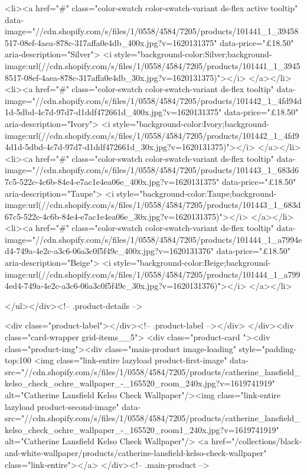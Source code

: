 {{{{{{{<li><a href="#" class="color-swatch color-swatch-variant ds-flex active tooltip" data-image="//cdn.shopify.com/s/files/1/0558/4584/7205/products/101441_1_39458517-08ef-4aea-878c-317affa0e4db_400x.jpg?v=1620131375" data-price="£18.50" aria-description="Silver">
              <i style="background-color:Silver;background-image:url(//cdn.shopify.com/s/files/1/0558/4584/7205/products/101441_1_39458517-08ef-4aea-878c-317affa0e4db_30x.jpg?v=1620131375)"></i>
            </a></li>
<li><a href="#" class="color-swatch color-swatch-variant ds-flex tooltip" data-image="//cdn.shopify.com/s/files/1/0558/4584/7205/products/101442_1_4fd94d1d-5dbd-4c7d-97d7-d1ddf472661d_400x.jpg?v=1620131375" data-price="£18.50" aria-description="Ivory">
              <i style="background-color:Ivory;background-image:url(//cdn.shopify.com/s/files/1/0558/4584/7205/products/101442_1_4fd94d1d-5dbd-4c7d-97d7-d1ddf472661d_30x.jpg?v=1620131375)"></i>
            </a></li>
<li><a href="#" class="color-swatch color-swatch-variant ds-flex tooltip" data-image="//cdn.shopify.com/s/files/1/0558/4584/7205/products/101443_1_683d67c5-522c-4c6b-84e4-e7ac1e4ea06e_400x.jpg?v=1620131375" data-price="£18.50" aria-description="Taupe">
              <i style="background-color:Taupe;background-image:url(//cdn.shopify.com/s/files/1/0558/4584/7205/products/101443_1_683d67c5-522c-4c6b-84e4-e7ac1e4ea06e_30x.jpg?v=1620131375)"></i>
            </a></li>
<li><a href="#" class="color-swatch color-swatch-variant ds-flex tooltip" data-image="//cdn.shopify.com/s/files/1/0558/4584/7205/products/101444_1_a7994ed4-749a-4e2c-a3c6-06a3c0f5f49c_400x.jpg?v=1620131376" data-price="£18.50" aria-description="Beige">
              <i style="background-color:Beige;background-image:url(//cdn.shopify.com/s/files/1/0558/4584/7205/products/101444_1_a7994ed4-749a-4e2c-a3c6-06a3c0f5f49c_30x.jpg?v=1620131376)"></i>
            </a></li>

      </ul></div><!-- .product-details -->

<div class="product-label"></div><!-- .product-label --></div>
          </div><div class="card-wrapper grid-items__5">
            <div class="product-card "><div class="product-img"><div class="main-product image-loading" style="padding-top:100%
      <img class="link-entire lazyload product-first-image" data-src="//cdn.shopify.com/s/files/1/0558/4584/7205/products/catherine_lansfield_kelso_check_ochre_wallpaper_-_165520_room_240x.jpg?v=1619741919" alt="Catherine Lansfield Kelso Check Wallpaper"/><img class="link-entire lazyload product-second-image" data-src="//cdn.shopify.com/s/files/1/0558/4584/7205/products/catherine_lansfield_kelso_check_ochre_wallpaper_-_165520_room1_240x.jpg?v=1619741919" alt="Catherine Lansfield Kelso Check Wallpaper"/>
      <a href="/collections/black-and-white-wallpaper/products/catherine-lansfield-kelso-check-wallpaper" class="link-entire"></a>
    </div><!-- .main-product -->
  
}}}}}}}
